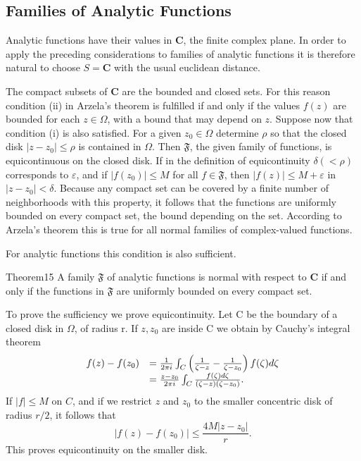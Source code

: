 \setcounter{section}{5}\setcounter{subsection}{3}\subsection{Families of Analytic Functions}\label{sec:5.5.4}
Analytic functions have their values in $\mathbf{C}$, the finite complex plane. In order to apply the preceding
considerations to families of analytic functions it is therefore natural to choose $S = \mathbf{C}$ with the usual euclidean distance.

The compact subsets of $\mathbf{C}$ are the bounded and closed sets. For this reason condition (ii) in Arzela's theorem is fulfilled if and only if the values $f(z)$ are bounded for each $z \in \Omega$, with a bound that may depend on $z$. Suppose now that condition (i) is also satisfied. For a given $z_0 \in \Omega$ determine $\rho$ so that the closed disk $|z - z_0| \leq \rho$ is contained in $\Omega$. Then $\mathfrak{F}$, the given family of functions, is equicontinuous on the closed disk. If in the definition of equicontinuity $\delta(<\rho)$ corresponds to $\varepsilon$, and if $|f(z_0)| \leq M$ for all $f \in \mathfrak{F}$, then $|f(z)| \leq M + \varepsilon$ in $|z - z_0| < \delta$. Because any compact set can be covered by a finite number of neighborhoods with this property, it follows that the functions are uniformly bounded on every compact set, the bound depending on the set. According to Arzela's theorem this is true for all normal families of complex-valued functions.

For analytic functions this condition is also sufficient.

\begin{originalstatement}{Theorem}{15}\label{thm:5.15}
A family $\mathfrak{F}$ of analytic functions is normal with respect to $\mathbf{C}$ if and only if the functions in $\mathfrak{F}$ are uniformly bounded on every compact set.
\end{originalstatement}
To prove the sufficiency we prove equicontinuity. Let C be the boundary of a closed disk in $\Omega$, of radius r. If $z, z_{0}$ are inside C we obtain by Cauchy's integral theorem
\begin{equation*}
\begin{array}{r l} f (z) - f (z _ {0}) & = \frac {1}{2 \pi i} \int_ {C} \left(\frac {1}{\zeta - z} - \frac {1}{\zeta - z _ {0}}\right) f (\zeta) d \zeta \\ & = \frac {z - z _ {0}}{2 \pi i} \int_ {C} \frac {f (\zeta) d \zeta}{(\zeta - z) (\zeta - z _ {0})}. \end{array}
\end{equation*}
If $|f| \leq M$ on $C$, and if we restrict $z$ and $z_0$ to the smaller concentric disk of radius $r/2$, it follows that
\begin{equation*}
\left| f (z) - f \left(z _ {0}\right) \right| \leq \frac {4 M \left| z - z _ {0} \right|}{r}.\tag{67}\label{eq:5.67}
\end{equation*}
This proves equicontinuity on the smaller disk.


